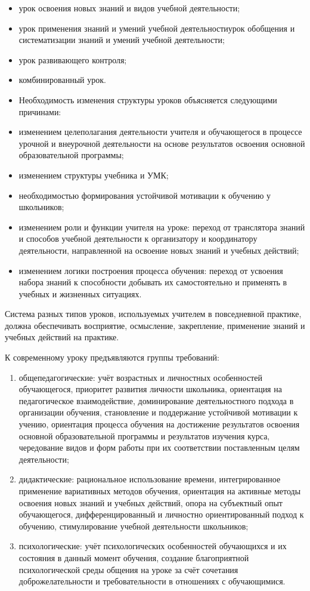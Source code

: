 \documentclass[
  11pt,
]{book}
\begin{document}
\begin{itemize}
\item
  урок освоения новых знаний и видов учебной деятельности;
\item
  урок применения знаний и умений учебной деятельностиурок обобщения и систематизации знаний и умений учебной деятельности;
\item
  урок развивающего контроля;
\item
  комбинированный урок.
\item
  Необходимость изменения структуры уроков объясняется следующими причинами:
\item
  изменением целеполагания деятельности учителя и обучающегося в процессе урочной и внеурочной деятельности на основе результатов освоения основной образовательной программы;
\item
  изменением структуры учебника и УМК;
\item
  необходимостью формирования устойчивой мотивации к обучению у школьников;
\item
  изменением роли и функции учителя на уроке: переход от транслятора знаний и способов учебной деятельности к организатору и координатору деятельности, направленной на освоение новых знаний и учебных действий;
\item
  изменением логики построения процесса обучения: переход от усвоения набора знаний к способности добывать их самостоятельно и применять в учебных и жизненных ситуациях.
\end{itemize}

Система разных типов уроков, используемых учителем в повседневной практике, должна обеспечивать восприятие, осмысление, закрепление, применение знаний и учебных действий на практике.

К современному уроку предъявляются группы требований:

\begin{enumerate}
\def\labelenumi{\arabic{enumi})}
\item
  общепедагогические: учёт возрастных и личностных особенностей обучающегося, приоритет развития личности школьника, ориентация на педагогическое взаимодействие, доминирование деятельностного подхода в организации обучения, становление и поддержание устойчивой мотивации к учению, ориентация процесса обучения на достижение результатов освоения основной образовательной программы и результатов изучения курса, чередование видов и форм работы при их соответствии поставленным целям деятельности;
\item
  дидактические: рациональное использование времени, интегрированное применение вариативных методов обучения, ориентация на активные методы освоения новых знаний и учебных действий, опора на субъектный опыт обучающегося, дифференцированный и личностно ориентированный подход к обучению, стимулирование учебной деятельности школьников;
\item
  психологические: учёт психологических особенностей обучающихся и их состояния в данный момент обучения, создание благоприятной психологической среды общения на уроке за счёт сочетания доброжелательности и требовательности в отношениях с обучающимися.
\end{enumerate}
\end{document}
